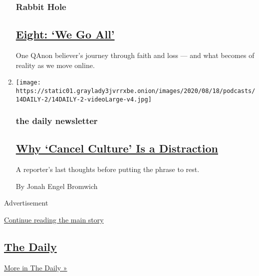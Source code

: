 \begin{enumerate}
  \hypertarget{rabbit-hole}{%
  \subsubsection{Rabbit Hole}\label{rabbit-hole}}

  \hypertarget{eight-we-go-all}{%
  \subsection{\texorpdfstring{\href{/2020/06/04/podcasts/rabbit-hole-qanon-youtube-tiktok-virus.html}{Eight:
  `We Go All'}}{Eight: `We Go All'}}\label{eight-we-go-all}}

  One QAnon believer's journey through faith and loss --- and what
  becomes of reality as we move online.
\item
  \texttt{[image: https://static01.graylady3jvrrxbe.onion/images/2020/08/18/podcasts/14DAILY-2/14DAILY-2-videoLarge-v4.jpg]}

  \hypertarget{the-daily-newsletter}{%
  \subsubsection{the daily newsletter}\label{the-daily-newsletter}}

  \hypertarget{why-cancel-culture-is-a-distraction}{%
  \subsection{\texorpdfstring{\href{/2020/08/14/podcasts/daily-newsletter-cancel-culture-beirut-protest.html}{Why
  `Cancel Culture' Is a
  Distraction}}{Why `Cancel Culture' Is a Distraction}}\label{why-cancel-culture-is-a-distraction}}

  A reporter's last thoughts before putting the phrase to rest.

  By Jonah Engel Bromwich
\end{enumerate}

Advertisement

\protect\hyperlink{after-mid1}{Continue reading the main story}

\hypertarget{the-daily-1}{%
\subsection{\texorpdfstring{\href{/column/the-daily}{The
Daily}}{The Daily}}\label{the-daily-1}}

\href{/column/the-daily}{More in The Daily »}

